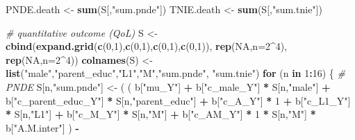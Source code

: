 \documentclass[
]{book}
\newenvironment{Shaded}{\begin{snugshade}}{\end{snugshade}}
\newcommand{\AttributeTok}[1]{\textcolor[rgb]{0.13,0.29,0.53}{#1}}
\newcommand{\CommentTok}[1]{\textcolor[rgb]{0.56,0.35,0.01}{\textit{#1}}}
\newcommand{\ConstantTok}[1]{\textcolor[rgb]{0.56,0.35,0.01}{#1}}
\newcommand{\ControlFlowTok}[1]{\textcolor[rgb]{0.13,0.29,0.53}{\textbf{#1}}}
\newcommand{\DecValTok}[1]{\textcolor[rgb]{0.00,0.00,0.81}{#1}}
\newcommand{\FunctionTok}[1]{\textcolor[rgb]{0.13,0.29,0.53}{\textbf{#1}}}
\newcommand{\NormalTok}[1]{#1}
\newcommand{\OtherTok}[1]{\textcolor[rgb]{0.56,0.35,0.01}{#1}}
\newcommand{\SpecialCharTok}[1]{\textcolor[rgb]{0.81,0.36,0.00}{\textbf{#1}}}
\newcommand{\StringTok}[1]{\textcolor[rgb]{0.31,0.60,0.02}{#1}}
\begin{document}
\begin{Shaded}
\begin{Highlighting}[]
\NormalTok{  PNDE.death }\OtherTok{\textless{}{-}} \FunctionTok{sum}\NormalTok{(S[,}\StringTok{"sum.pnde"}\NormalTok{])}
\NormalTok{  TNIE.death }\OtherTok{\textless{}{-}} \FunctionTok{sum}\NormalTok{(S[,}\StringTok{"sum.tnie"}\NormalTok{])}
  
  
  \CommentTok{\# quantitative outcome (QoL)}
\NormalTok{  S }\OtherTok{\textless{}{-}} \FunctionTok{cbind}\NormalTok{(}\FunctionTok{expand.grid}\NormalTok{(}\FunctionTok{c}\NormalTok{(}\DecValTok{0}\NormalTok{,}\DecValTok{1}\NormalTok{),}\FunctionTok{c}\NormalTok{(}\DecValTok{0}\NormalTok{,}\DecValTok{1}\NormalTok{),}\FunctionTok{c}\NormalTok{(}\DecValTok{0}\NormalTok{,}\DecValTok{1}\NormalTok{),}\FunctionTok{c}\NormalTok{(}\DecValTok{0}\NormalTok{,}\DecValTok{1}\NormalTok{)), }\FunctionTok{rep}\NormalTok{(}\ConstantTok{NA}\NormalTok{,}\AttributeTok{n=}\DecValTok{2}\SpecialCharTok{\^{}}\DecValTok{4}\NormalTok{), }\FunctionTok{rep}\NormalTok{(}\ConstantTok{NA}\NormalTok{,}\AttributeTok{n=}\DecValTok{2}\SpecialCharTok{\^{}}\DecValTok{4}\NormalTok{))}
  \FunctionTok{colnames}\NormalTok{(S) }\OtherTok{\textless{}{-}} \FunctionTok{list}\NormalTok{(}\StringTok{"male"}\NormalTok{,}\StringTok{"parent\_educ"}\NormalTok{,}\StringTok{"L1"}\NormalTok{,}\StringTok{"M"}\NormalTok{,}\StringTok{"sum.pnde"}\NormalTok{, }\StringTok{"sum.tnie"}\NormalTok{)}
  \ControlFlowTok{for}\NormalTok{ (n }\ControlFlowTok{in} \DecValTok{1}\SpecialCharTok{:}\DecValTok{16}\NormalTok{) \{}
    \CommentTok{\# PNDE }
\NormalTok{    S[n,}\StringTok{"sum.pnde"}\NormalTok{] }\OtherTok{\textless{}{-}}\NormalTok{ ( ( b[}\StringTok{"mu\_Y"}\NormalTok{] }\SpecialCharTok{+} 
\NormalTok{                             b[}\StringTok{"c\_male\_Y"}\NormalTok{] }\SpecialCharTok{*}\NormalTok{ S[n,}\StringTok{"male"}\NormalTok{] }\SpecialCharTok{+} 
\NormalTok{                             b[}\StringTok{"c\_parent\_educ\_Y"}\NormalTok{] }\SpecialCharTok{*}\NormalTok{ S[n,}\StringTok{"parent\_educ"}\NormalTok{] }\SpecialCharTok{+} 
\NormalTok{                             b[}\StringTok{"c\_A\_Y"}\NormalTok{] }\SpecialCharTok{*} \DecValTok{1} \SpecialCharTok{+} 
\NormalTok{                             b[}\StringTok{"c\_L1\_Y"}\NormalTok{] }\SpecialCharTok{*}\NormalTok{ S[n,}\StringTok{"L1"}\NormalTok{] }\SpecialCharTok{+}
\NormalTok{                             b[}\StringTok{"c\_M\_Y"}\NormalTok{] }\SpecialCharTok{*}\NormalTok{ S[n,}\StringTok{"M"}\NormalTok{] }\SpecialCharTok{+}
\NormalTok{                             b[}\StringTok{"c\_AM\_Y"}\NormalTok{] }\SpecialCharTok{*} \DecValTok{1} \SpecialCharTok{*}\NormalTok{ S[n,}\StringTok{"M"}\NormalTok{] }\SpecialCharTok{*}\NormalTok{ b[}\StringTok{"A.M.inter"}\NormalTok{] ) }\SpecialCharTok{{-}} 

\end{Highlighting}
\end{Shaded}
\end{document}
